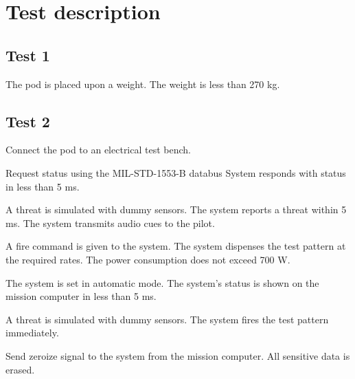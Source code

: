\documentclass[Main]{subfiles}
\begin{document}
\chapter{Test description}

\section{Test 1}


\begin{TestCaseIntro}
\end{TestCaseIntro}

\begin{TestCase}
\TC
{The pod is placed upon a weight.}
{The weight is less than 270 kg.}

\end{TestCase}


\newpage
\section{Test 2}

\begin{TestCaseIntro}
\end{TestCaseIntro}

\begin{TestCase}
\TC
{Connect the pod to an electrical test bench.}
{}

\TC
{Request status using the MIL-STD-1553-B databus}
{System responds with status in less than 5 ms.}

\TC
{A threat is simulated with dummy sensors.}
{The system reports a threat within 5 ms.
The system transmits audio cues to the pilot.}


\TC
{A fire command is given to the system.}
{The system dispenses the test pattern at the required rates.
The power consumption does not exceed 700 W.}

\TC
{The system is set in automatic mode.}
{The system's status is shown on the mission computer in less than 5 ms.}

\TC
{A threat is simulated with dummy sensors.}
{The system fires the test pattern immediately.}


\TC
{Send zeroize signal to the system from the mission computer.}
{All sensitive data is erased.}
\end{TestCase}
\end{document}
